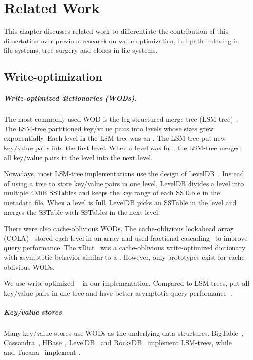 \chapter{Related Work}
\label{chap:related}

This chapter discusses related work to differentiate the contribution of
this dissertation
over previous research on write-optimization, full-path indexing in file
systems, tree surgery and clones in file systems.

\section{Write-optimization}

\paragraph{Write-optimized dictionaries (WODs).}
The most commonly used WOD is the
log-structured merge tree (LSM-tree)~\cite{lsm}.
The LSM-tree partitioned key/value pairs into levels
whose sizes grew exponentially.
Each level in the LSM-tree was an \btree.
The LSM-tree put new key/value pairs into the first level.
When a level was full, the LSM-tree merged all key/value pairs in the level
into the next level.

Nowadays, most LSM-tree implementations use the design of
LevelDB~\cite{leveldb}.
Instead of using a tree to store key/value pairs in one level,
LevelDB divides a level into multiple 4MiB SSTables and
keeps the key range of each SSTable in the metadata file.
When a level is full, LevelDB picks an SSTable in the level and merges the
SSTable with SSTables in the next level.

There were also cache-oblivious WODs.
The cache-oblivious lookahead array (COLA)~\citep{cola} stored
each level in an array
and used fractional cascading~\citep{fcascading} to improve query performance.
The xDict~\citep{xdict} was a cache-oblivious write-optimized dictionary with
asymptotic behavior similar to a \bet.
However, only prototypes exist for cache-oblivious WODs.

We use write-optimized \bets~\cite{bet} in our implementation.
Compared to LSM-trees, \bets put all key/value pairs in one tree and have
better asymptotic query performance~\cite{betlogin}.

\paragraph{Key/value stores.}
Many key/value stores use WODs as the underlying data structures.
BigTable~\citep{bigtable}, Cassandra~\citep{cassandra}, HBase~\citep{hbase},
LevelDB~\citep{leveldb} and RocksDB~\citep{rocksdb} implement LSM-trees,
while \fti~\cite{fti} and Tucana~\cite{tucana} implement \bets.

